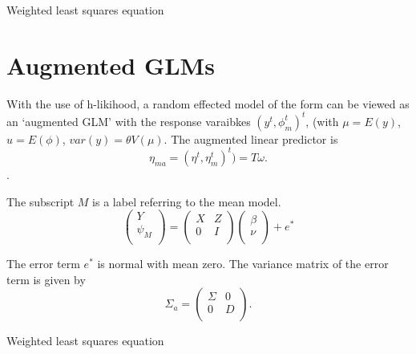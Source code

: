\documentclass[12pt, a4paper]{article}
\begin{document}
Weighted least squares equation



\section{Augmented GLMs} %

With the use of h-likihood, a random effected model of the form can be viewed as an `augmented GLM' with the response varaibkes $(y^t, \phi^t_m)^t$, (with $\mu = E(y)$,$ u = E(\phi)$, $var(y) = \theta V (\mu)$.
The augmented linear predictor is \[\eta_{ma}  = (\eta^t, \eta^t_m)^t) = T\omega. \].




The subscript $M$ is a label referring to the mean model.
\begin{equation}
\left(%
\begin{array}{c}
Y \\
\psi_{M} \\
\end{array}%
\right) = \left(
\begin{array}{cc}
X & Z \\
0 & I \\
\end{array}\right) \left(%
\begin{array}{c}
\beta \\
\nu \\
\end{array}%
\right)+ e^{*}
\end{equation}




The error term $e^{*}$ is normal with mean zero. The variance matrix of the error term is given by
\begin{equation}
\Sigma_{a} = \left(%
\begin{array}{cc}
\Sigma & 0 \\
0 & D \\
\end{array}%
\right).
\end{equation}



Weighted least squares equation
\end{document}
